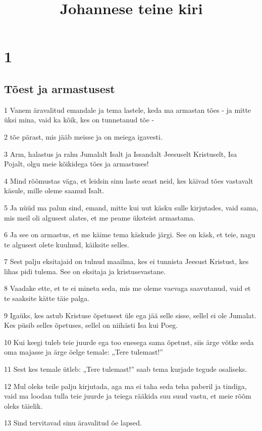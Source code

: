 

\title{Johannese teine kiri}

\chapter{1}

\section*{Tõest ja armastusest}

\par 1 Vanem äravalitud emandale ja tema lastele, keda ma armastan tões - ja mitte üksi mina, vaid ka kõik, kes on tunnetanud tõe -
\par 2 tõe pärast, mis jääb meisse ja on meiega igavesti.
\par 3 Arm, halastus ja rahu Jumalalt Isalt ja Issandalt Jeesuselt Kristuselt, Isa Pojalt, olgu meie kõikidega tões ja armastuses!
\par 4 Mind rõõmustas väga, et leidsin sinu laste seast neid, kes käivad tões vastavalt käsule, mille oleme saanud Isalt.
\par 5 Ja nüüd ma palun sind, emand, mitte kui uut käsku sulle kirjutades, vaid sama, mis meil oli algusest alates, et me peame üksteist armastama.
\par 6 Ja see on armastus, et me käime tema käskude järgi. See on käsk, et teie, nagu te algusest olete kuulnud, käiksite selles.
\par 7 Sest palju eksitajaid on tulnud maailma, kes ei tunnista Jeesust Kristust, kes lihas pidi tulema. See on eksitaja ja kristusevastane.
\par 8 Vaadake ette, et te ei mineta seda, mis me oleme vaevaga saavutanud, vaid et te saaksite kätte täie palga.
\par 9 Igaüks, kes astub Kristuse õpetusest üle ega jää selle sisse, sellel ei ole Jumalat. Kes püsib selles õpetuses, sellel on niihästi Isa kui Poeg.
\par 10 Kui keegi tuleb teie juurde ega too enesega sama õpetust, siis ärge võtke seda oma majasse ja ärge öelge temale: „Tere tulemast!”
\par 11 Sest kes temale ütleb: „Tere tulemast!” saab tema kurjade tegude osaliseks.
\par 12 Mul oleks teile palju kirjutada, aga ma ei taha seda teha paberil ja tindiga, vaid ma loodan tulla teie juurde ja teiega rääkida suu suud vastu, et meie rõõm oleks täielik.
\par 13 Sind tervitavad sinu äravalitud õe lapsed.



